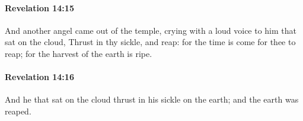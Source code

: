 		\paragraph{Revelation 14:15} %
			\label{REVELATIONNT-14-15}

			And another angel came out of the temple, crying with a loud voice to him that sat on the cloud, Thrust in thy sickle, and reap: for the time is come for thee to reap; for the harvest of the earth is ripe.

			\begin{framed}
			\scriptsize
				\begin{compactdesc}
					\item[SBLG] 
				\end{compactdesc}
			\end{framed}

		\paragraph{Revelation 14:16} %
			\label{REVELATIONNT-14-16}

			And he that sat on the cloud thrust in his sickle on the earth; and the earth was reaped.

